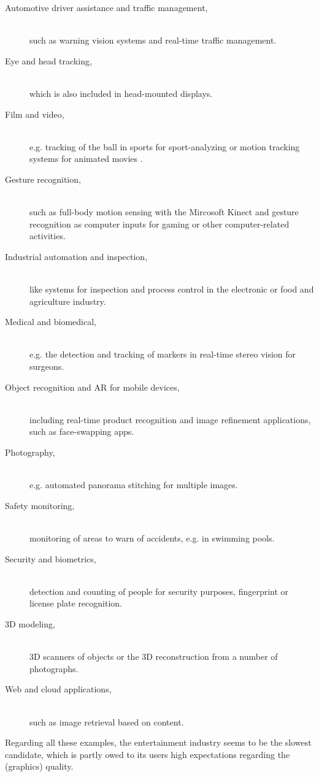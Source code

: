 \begin{description}
\item [Automotive driver assistance and traffic management,]\hfill \\ such as warning vision systems and real-time traffic management.
\item [Eye and head tracking,]\hfill \\ which is also included in head-mounted displays.
\item [Film and video,]\hfill \\ e.g. tracking of the ball in sports for sport-analyzing or motion tracking systems for animated movies .
\item [Gesture recognition,]\hfill \\ such as full-body motion sensing with the Mircosoft Kinect and gesture recognition as computer inputs for gaming or other computer-related activities.
\item [Industrial automation and inspection,]\hfill \\ like systems for inspection and process control in the electronic or food and agriculture industry. 
\item [Medical and biomedical,]\hfill \\ e.g. the detection and tracking of markers in real-time stereo vision for surgeons.
\item [Object recognition and AR for mobile devices,]\hfill \\ including real-time product recognition and image refinement applications, such as face-swapping apps.
\item [Photography,]\hfill \\ e.g. automated panorama stitching for multiple images.
\item [Safety monitoring,]\hfill \\ monitoring of areas to warn of accidents, e.g. in swimming pools.
\item [Security and biometrics,]\hfill \\ detection and counting of people for security purposes, fingerprint or license plate recognition.
\item [3D modeling,]\hfill \\ 3D scanners of objects or the 3D reconstruction from a number of photographs. 
\item [Web and cloud applications,]\hfill \\ such as image retrieval based on content. 
\end{description}

Regarding all these examples, the entertainment industry seems to be the slowest candidate, which is partly owed to its users high expectations regarding the (graphics) quality. 
